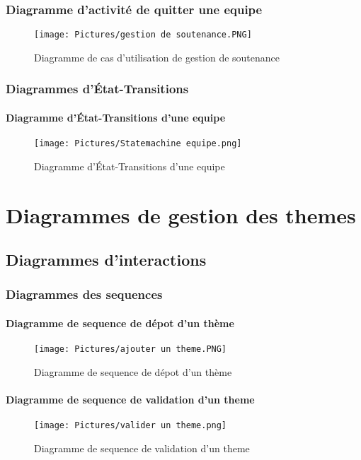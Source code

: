 \documentclass[11pt,fleqn]{book} %
\begin{document}
\subsection{Diagramme d'activité de quitter une equipe}
\begin{figure}[h]
    \centering
    \texttt{[image: Pictures/gestion de soutenance.PNG]}
    \caption{Diagramme de cas d'utilisation de gestion de soutenance}
    \label{fig:pca}
\end{figure}
\newpage
\subsection{Diagrammes d’État-Transitions}
\subsubsection{Diagramme d'État-Transitions d'une equipe}
\begin{figure}[h]
    \centering
    \texttt{[image: Pictures/Statemachine equipe.png]}
    \caption{Diagramme d'État-Transitions d'une equipe}
    \label{fig:pca}
\end{figure}
\chapter{Diagrammes de gestion des themes}
\section{Diagrammes d'interactions}
\subsection{Diagrammes des sequences}
\subsubsection{Diagramme de sequence de dépot d'un thème}
\begin{figure}[h]
    \centering
    \texttt{[image: Pictures/ajouter un theme.PNG]}
    \caption{Diagramme de sequence de dépot d'un thème}
    \label{fig:pca}
\end{figure}
\newpage
\subsubsection{Diagramme de sequence de validation d'un theme}
\begin{figure}[h]
    \centering
    \texttt{[image: Pictures/valider un theme.png]}
    \caption{Diagramme de sequence de validation d'un theme}
    \label{fig:pca}
\end{figure}
\newpage
\end{document}
